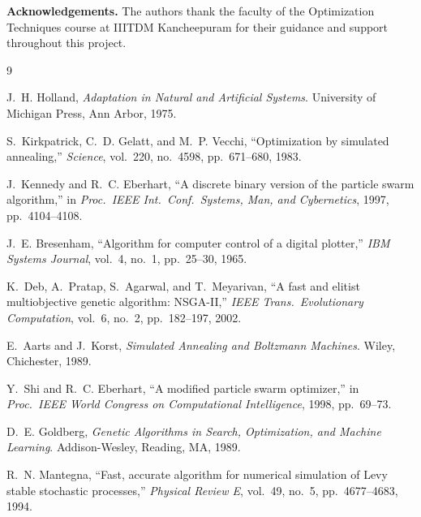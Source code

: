 \documentclass[12pt,a4paper]{article}
\begin{document}
\vspace{1cm}
\noindent\textbf{Acknowledgements.}
The authors thank the faculty of the Optimization Techniques course at IIITDM Kancheepuram for their guidance and support throughout this project.

\begin{thebibliography}{9}

J.~H. Holland,
\textit{Adaptation in Natural and Artificial Systems}.
University of Michigan Press, Ann Arbor, 1975.

S.~Kirkpatrick, C.~D. Gelatt, and M.~P. Vecchi,
``Optimization by simulated annealing,''
\textit{Science}, vol.~220, no.~4598, pp.~671--680, 1983.

J.~Kennedy and R.~C. Eberhart,
``A discrete binary version of the particle swarm algorithm,''
in \textit{Proc.\ IEEE Int.\ Conf.\ Systems, Man, and Cybernetics}, 1997, pp.~4104--4108.

J.~E. Bresenham,
``Algorithm for computer control of a digital plotter,''
\textit{IBM Systems Journal}, vol.~4, no.~1, pp.~25--30, 1965.

K.~Deb, A.~Pratap, S.~Agarwal, and T.~Meyarivan,
``A fast and elitist multiobjective genetic algorithm: NSGA-II,''
\textit{IEEE Trans.\ Evolutionary Computation}, vol.~6, no.~2, pp.~182--197, 2002.

E.~Aarts and J.~Korst,
\textit{Simulated Annealing and Boltzmann Machines}.
Wiley, Chichester, 1989.

Y.~Shi and R.~C. Eberhart,
``A modified particle swarm optimizer,''
in \textit{Proc.\ IEEE World Congress on Computational Intelligence}, 1998, pp.~69--73.

D.~E. Goldberg,
\textit{Genetic Algorithms in Search, Optimization, and Machine Learning}.
Addison-Wesley, Reading, MA, 1989.

R.~N. Mantegna,
``Fast, accurate algorithm for numerical simulation of Levy stable stochastic processes,''
\textit{Physical Review E}, vol.~49, no.~5, pp.~4677--4683, 1994.

\end{thebibliography}
\end{document}
